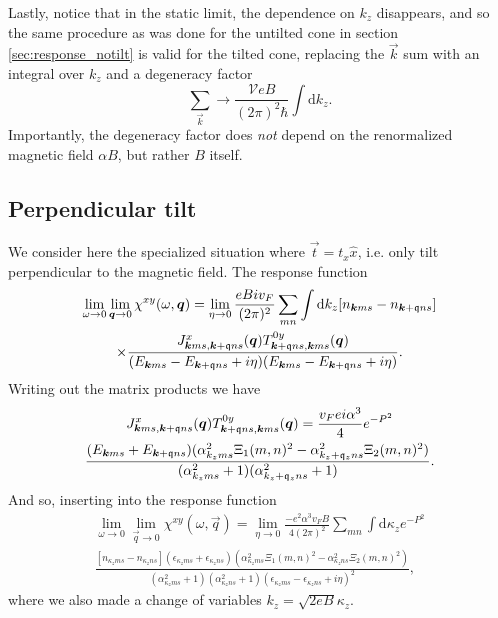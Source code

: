 Lastly, notice that in the static limit, the dependence on \( k_z \) disappears, and so the same procedure as was done for the untilted cone in section \ref{sec:response_notilt} is valid for the tilted cone, replacing the \( \vec{k} \) sum with an integral over \( k_z \) and a degeneracy factor
\begin{equation}
  \label{eq:103}
  \sum\limits_{\vec{k}}^{} \to \frac{\mathcal{V} e B}{(2\pi)^2 \hbar} \int \mathrm{d} k_z.
\end{equation}
Importantly, the degeneracy factor does \emph{not} depend on the renormalized magnetic field \( \alpha B \), but rather \( B \) itself.

\subsection{Perpendicular tilt}
\label{sec:perptiltsum}
We consider here the specialized situation where \( \vec{t} = t_x \hat{x} \), i.e. only tilt perpendicular to the magnetic field.
The response function
\begin{multline*}
  \lim_{\omega \to 0} \lim_{\bm{q} \to 0} \chi^{xy}(\omega, \bm{q}) = \lim_{\eta \to 0}
  \frac{e B i v_F}{(2 \pi)^2}
  \sum\limits_{mn}^{} \int \mathrm{d}k_z [n_{\bm{k} m s} - n_{\bm{k}+\mathfrak{q} n s}]\\
  \times \frac{
    J^x_{\bm{k} m s, \bm{k} + \mathfrak{q} ns} (\bm{q}) T^{0y}_{\bm{k}+\mathfrak{q} n s, \bm{k}ms}(\bm{q})
  }{
    (E_{\bm{k} m s} - E_{\bm{k}+\mathfrak{q} ns} + i \eta)(E_{\bm{k}ms}-E_{\bm{k}+\mathfrak{q} ns} + i \eta)
  }.
\end{multline*}
Writing out the matrix products we have
\begin{multline}
  J^x_{\bm{k} m s, \bm{k} + \mathfrak{q} ns} (\bm{q}) T^{0y}_{\bm{k}+\mathfrak{q} n s, \bm{k}ms}(\bm{q})
  =
  \frac{v_F e i \alpha^{3}}{4}
  e^{-P^2}\\
  \frac{
    (E_{\bm{k} m s} + E_{\bm{k}+\mathfrak{q} n s})
    (\alpha_{k_z m s}^2 \Xi_1(m,n)^2 - \alpha_{k_z + \mathfrak{q}_z n s}^2 \Xi_2(m,n)^2)
  }{
    (\alpha_{k_z m s}^2 + 1)(\alpha_{k_z + \mathfrak{q}_z n s}^2 + 1)
  }.
  \label{eq:100}
\end{multline}
And so, inserting into the response function
\begin{multline}
  \label{eq:101}
  \lim_{\omega \to 0} \lim_{\vec{q} \to 0} \chi^{xy}(\omega, \vec{q}) = \lim_{\eta \to 0}
  \frac{- e^2 \alpha^3 v_F B }{4 (2 \pi)^2 }
  \sum\limits_{mn}^{}
  \int \mathrm{d}\kappa_z
  e^{-P^2}\\
  \frac{
    [n_{\kappa_z m s} - n_{\kappa_z n s}]
    (\epsilon_{\kappa_z m s} + \epsilon_{\kappa_z n s})
    (\alpha_{\kappa_z m s}^2 \Xi_1(m,n)^2 - \alpha_{\kappa_z n s}^2 \Xi_2(m,n)^2)
  }{
    (\alpha_{\kappa_z m s}^2 + 1)(\alpha_{\kappa_z n s}^2 + 1)
    (\epsilon_{\kappa_z m s} - \epsilon_{\kappa_z ns} + i \eta)^2
  },
\end{multline}
where we also made a change of variables \( k_z = \sqrt{2 e B} \kappa_z \).

